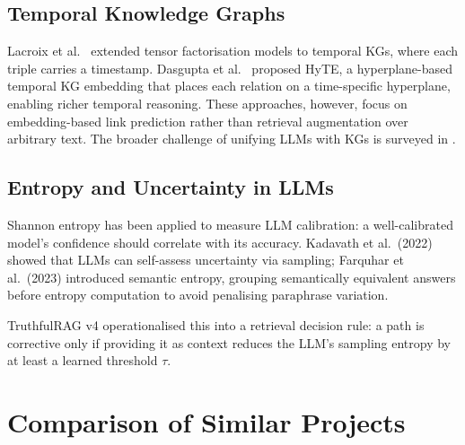 \subsection{Temporal Knowledge Graphs}

Lacroix et al.\ \cite{lacroix2020temporal} extended tensor factorisation models
to temporal KGs, where each triple carries a timestamp. Dasgupta et al.\
\cite{dasgupta2018tkg} proposed HyTE, a hyperplane-based temporal KG embedding
that places each relation on a time-specific hyperplane, enabling richer temporal
reasoning. These approaches, however, focus on embedding-based link prediction
rather than retrieval augmentation over arbitrary text. The broader challenge of
unifying LLMs with KGs is surveyed in \cite{pan2024kg}.

\subsection{Entropy and Uncertainty in LLMs}

Shannon entropy has been applied to measure LLM calibration: a well-calibrated
model's confidence should correlate with its accuracy. Kadavath et al.\ (2022)
showed that LLMs can self-assess uncertainty via sampling; Farquhar et al.\
(2023) introduced semantic entropy, grouping semantically equivalent answers
before entropy computation to avoid penalising paraphrase variation.

TruthfulRAG v4 \cite{truthfulrag2024} operationalised this into a retrieval
decision rule: a path is corrective only if providing it as context reduces the
LLM's sampling entropy by at least a learned threshold $\tau$.

\section{Comparison of Similar Projects}


